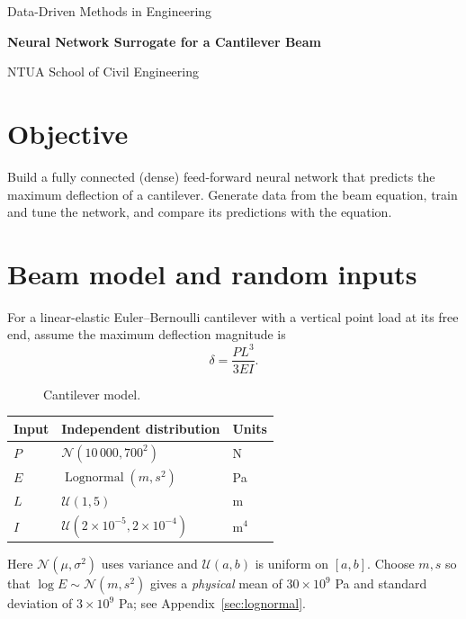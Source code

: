 \documentclass[11pt]{article}
\begin{document}
\begin{center}
  {\large Data-Driven Methods in Engineering\par}
  \vspace{0.4em}
  {\LARGE\bfseries Neural Network Surrogate for a Cantilever Beam\par}
  \vspace{0.3em}
  {NTUA School of Civil Engineering\par}
\end{center}

\section*{Objective}
\aitrap Build a fully connected (dense) feed-forward neural network that predicts the maximum deflection of a cantilever. Generate data from the beam equation, train and tune the network, and compare its predictions with the equation.

\section*{Beam model and random inputs}
For a linear-elastic Euler--Bernoulli cantilever with a vertical point load at its free end, assume the maximum deflection magnitude is
\[
  \boxed{\delta=\frac{PL^3}{3EI}}.
\]

\begin{figure}[htbp]
  \centering
  \cantileverdrawing
  \caption{Cantilever model.}
\end{figure}

\begin{center}
\begin{tabular}{@{}lll@{}}
\toprule
Input & Independent distribution & Units \\
\midrule
$P$ & $\mathcal N(10\,000,700^2)$ & N \\
$E$ & $\operatorname{Lognormal}(m,s^2)$ & Pa \\
$L$ & $\mathcal U(1,5)$ & m \\
$I$ & $\mathcal U(2\times10^{-5},2\times10^{-4})$ & m$^4$ \\
\bottomrule
\end{tabular}
\end{center}

Here $\mathcal N(\mu,\sigma^2)$ uses variance and $\mathcal U(a,b)$ is uniform on $[a,b]$. Choose $m,s$ so that $\log E\sim\mathcal N(m,s^2)$ gives a \emph{physical} mean of $30\times10^9$ Pa and standard deviation of $3\times10^9$ Pa; see Appendix~\ref{sec:lognormal}.
\end{document}
